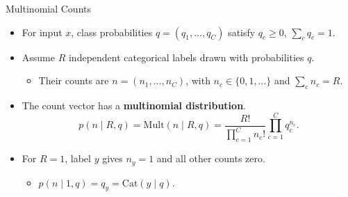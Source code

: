 \begin{frame}{Multinomial Counts}
\label{frm:appendix-multinomial-distribution}
\setlength{\abovedisplayskip}{5pt}
\setlength{\belowdisplayskip}{5pt}
\begin{itemize}
\setlength{\itemsep}{5mm}
\item For input $x$, class probabilities $q=(q_1,\ldots,q_C)$ satisfy $q_c\geq0$, $\sum_cq_c=1$.
\item Assume $R$ independent categorical labels drawn with probabilities $q$.
\begin{itemize}
\item Their counts are $n=(n_1,\ldots,n_C)$, with $n_c\in\{0,1,\ldots\}$ and $\sum_cn_c=R$.
\end{itemize}
\item The count vector has a \textbf{multinomial distribution}.
\[
p(n\mid R,q)=\mathrm{Mult}(n\mid R,q)
=\frac{R!}{\prod_{c=1}^{C}n_c!}\prod_{c=1}^{C}q_c^{n_c}.
\]
\item For $R=1$, label $y$ gives $n_y=1$ and all other counts zero.
\begin{itemize}
\item $p(n\mid1,q)=q_y=\mathrm{Cat}(y\mid q)$.
\end{itemize}
\end{itemize}
\end{frame}

